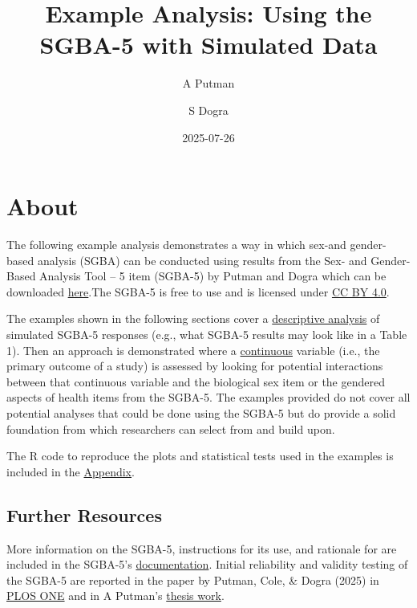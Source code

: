 \documentclass[
]{book}
\title{Example Analysis: Using the SGBA-5 with Simulated Data}
\author{A Putman \and S Dogra}
\date{2025-07-26}
\begin{document}
\maketitle

{
\setcounter{tocdepth}{1}
\tableofcontents
}
\chapter{About}\label{about}

The following example analysis demonstrates a way in which sex-and gender-based analysis (SGBA) can be conducted using results from the Sex- and Gender-Based Analysis Tool -- 5 item (SGBA-5) by Putman and Dogra which can be downloaded \href{https://figshare.com/articles/journal_contribution/Sex-_and_gender-based_analysis_tool_5-item_v1_0_/29090615?file=54611480}{here}.The SGBA-5 is free to use and is licensed under \href{https://creativecommons.org/licenses/by/4.0/}{CC BY 4.0}.

The examples shown in the following sections cover a \hyperref[descriptive-analysis]{descriptive analysis} of simulated SGBA-5 responses (e.g., what SGBA-5 results may look like in a Table 1). Then an approach is demonstrated where a \hyperref[continuous]{continuous} variable (i.e., the primary outcome of a study) is assessed by looking for potential interactions between that continuous variable and the biological sex item or the gendered aspects of health items from the SGBA-5. The examples provided do not cover all potential analyses that could be done using the SGBA-5 but do provide a solid foundation from which researchers can select from and build upon.

The R code to reproduce the plots and statistical tests used in the examples is included in the \hyperref[appendix]{Appendix}.

\section{Further Resources}\label{further-resources}

More information on the SGBA-5, instructions for its use, and rationale for are included in the SGBA-5's \href{https://figshare.com/articles/journal_contribution/Sex-_and_gender-based_analysis_tool_5-item_v1_0_/29090615?file=54611480}{documentation}. Initial reliability and validity testing of the SGBA-5 are reported in the paper by Putman, Cole, \& Dogra (2025) in \href{https://doi.org/10.1371/journal.pone.0323834}{PLOS ONE} and in A Putman's \href{https://ontariotechu.scholaris.ca/items/fddf2667-8cd6-429d-85bd-74b0076ab561}{thesis work}.
\end{document}
